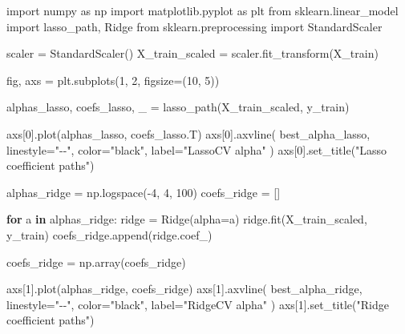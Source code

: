 \documentclass[
  letterpaper,
  DIV=11,
  numbers=noendperiod]{scrreprt}
\newenvironment{Shaded}{\begin{snugshade}}{\end{snugshade}}
\newcommand{\ControlFlowTok}[1]{\textcolor[rgb]{0.00,0.23,0.31}{\textbf{#1}}}
\newcommand{\DecValTok}[1]{\textcolor[rgb]{0.68,0.00,0.00}{#1}}
\newcommand{\ImportTok}[1]{\textcolor[rgb]{0.00,0.46,0.62}{#1}}
\newcommand{\KeywordTok}[1]{\textcolor[rgb]{0.00,0.23,0.31}{\textbf{#1}}}
\newcommand{\NormalTok}[1]{\textcolor[rgb]{0.00,0.23,0.31}{#1}}
\newcommand{\OperatorTok}[1]{\textcolor[rgb]{0.37,0.37,0.37}{#1}}
\newcommand{\StringTok}[1]{\textcolor[rgb]{0.13,0.47,0.30}{#1}}
\theoremstyle{definition}
\theoremstyle{definition}
\theoremstyle{plain}
\theoremstyle{plain}
\theoremstyle{remark}
\begin{document}
\begin{Shaded}
\begin{Highlighting}[]
\ImportTok{import}\NormalTok{ numpy }\ImportTok{as}\NormalTok{ np}
\ImportTok{import}\NormalTok{ matplotlib.pyplot }\ImportTok{as}\NormalTok{ plt}
\ImportTok{from}\NormalTok{ sklearn.linear\_model }\ImportTok{import}\NormalTok{ lasso\_path, Ridge}
\ImportTok{from}\NormalTok{ sklearn.preprocessing }\ImportTok{import}\NormalTok{ StandardScaler}

\NormalTok{scaler }\OperatorTok{=}\NormalTok{ StandardScaler()}
\NormalTok{X\_train\_scaled }\OperatorTok{=}\NormalTok{ scaler.fit\_transform(X\_train)}

\NormalTok{fig, axs }\OperatorTok{=}\NormalTok{ plt.subplots(}\DecValTok{1}\NormalTok{, }\DecValTok{2}\NormalTok{, figsize}\OperatorTok{=}\NormalTok{(}\DecValTok{10}\NormalTok{, }\DecValTok{5}\NormalTok{))}


\NormalTok{alphas\_lasso, coefs\_lasso, \_ }\OperatorTok{=}\NormalTok{ lasso\_path(X\_train\_scaled, y\_train)}

\NormalTok{axs[}\DecValTok{0}\NormalTok{].plot(alphas\_lasso, coefs\_lasso.T)}
\NormalTok{axs[}\DecValTok{0}\NormalTok{].axvline(}
\NormalTok{    best\_alpha\_lasso, linestyle}\OperatorTok{=}\StringTok{"{-}{-}"}\NormalTok{, color}\OperatorTok{=}\StringTok{"black"}\NormalTok{, label}\OperatorTok{=}\StringTok{"LassoCV alpha"}
\NormalTok{)}
\NormalTok{axs[}\DecValTok{0}\NormalTok{].set\_title(}\StringTok{"Lasso coefficient paths"}\NormalTok{)}

\NormalTok{alphas\_ridge }\OperatorTok{=}\NormalTok{ np.logspace(}\OperatorTok{{-}}\DecValTok{4}\NormalTok{, }\DecValTok{4}\NormalTok{, }\DecValTok{100}\NormalTok{)}
\NormalTok{coefs\_ridge }\OperatorTok{=}\NormalTok{ []}

\ControlFlowTok{for}\NormalTok{ a }\KeywordTok{in}\NormalTok{ alphas\_ridge:}
\NormalTok{    ridge }\OperatorTok{=}\NormalTok{ Ridge(alpha}\OperatorTok{=}\NormalTok{a)}
\NormalTok{    ridge.fit(X\_train\_scaled, y\_train)}
\NormalTok{    coefs\_ridge.append(ridge.coef\_)}

\NormalTok{coefs\_ridge }\OperatorTok{=}\NormalTok{ np.array(coefs\_ridge)}

\NormalTok{axs[}\DecValTok{1}\NormalTok{].plot(alphas\_ridge, coefs\_ridge)}
\NormalTok{axs[}\DecValTok{1}\NormalTok{].axvline(}
\NormalTok{    best\_alpha\_ridge, linestyle}\OperatorTok{=}\StringTok{"{-}{-}"}\NormalTok{, color}\OperatorTok{=}\StringTok{"black"}\NormalTok{, label}\OperatorTok{=}\StringTok{"RidgeCV alpha"}
\NormalTok{)}
\NormalTok{axs[}\DecValTok{1}\NormalTok{].set\_title(}\StringTok{"Ridge coefficient paths"}\NormalTok{)}


\end{Highlighting}
\end{Shaded}
\end{document}

